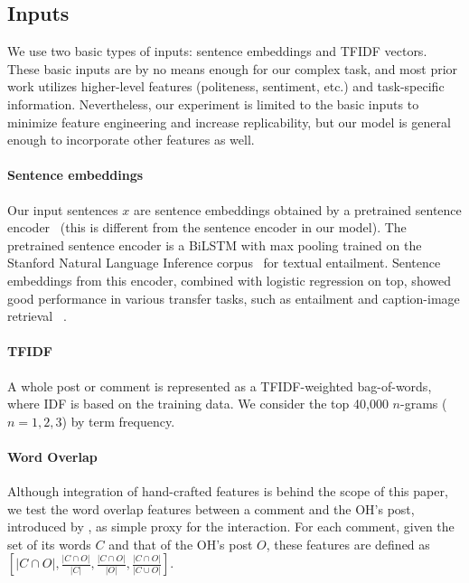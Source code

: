\documentclass[11pt,a4paper]{article}
\begin{document}
\subsection{Inputs}
We use two basic types of inputs: sentence embeddings and TFIDF vectors. These basic inputs are by no means enough for our complex task, and most prior work utilizes higher-level features (politeness, sentiment, etc.) and task-specific information. Nevertheless, our experiment is limited to the basic inputs to minimize feature engineering and increase replicability, but our model is general enough to incorporate other features as well.

\paragraph{Sentence embeddings} Our input sentences $x$ are sentence embeddings obtained by a pretrained sentence encoder~\cite{Conneau:2017uf} (this is different from the sentence encoder in our model). The pretrained sentence encoder is a BiLSTM with max pooling trained on the Stanford Natural Language Inference corpus~\cite{snli:emnlp2015} for textual entailment. Sentence embeddings from this encoder, combined with logistic regression on top, showed good performance in various transfer tasks, such as entailment and caption-image retrieval ~\cite{Conneau:2017uf}. 

\paragraph{TFIDF}
A whole post or comment is represented as a TFIDF-weighted bag-of-words, where IDF is based on the training data. We consider the top 40,000 $n$-grams ($n = 1, 2, 3$) by term frequency.

\paragraph{Word Overlap}
Although integration of hand-crafted features is behind the scope of this paper, we test the word overlap features between a comment and the OH's post, introduced by , as simple proxy for the interaction. For each comment, given the set of its words $C$ and that of the OH's post $O$, these features are defined as $\left[ |C \cap O|, \frac{|C \cap O|}{|C|}, \frac{|C \cap O|}{|O|}, \frac{|C \cap O|}{|C \cup O|} \right]$.
\end{document}
